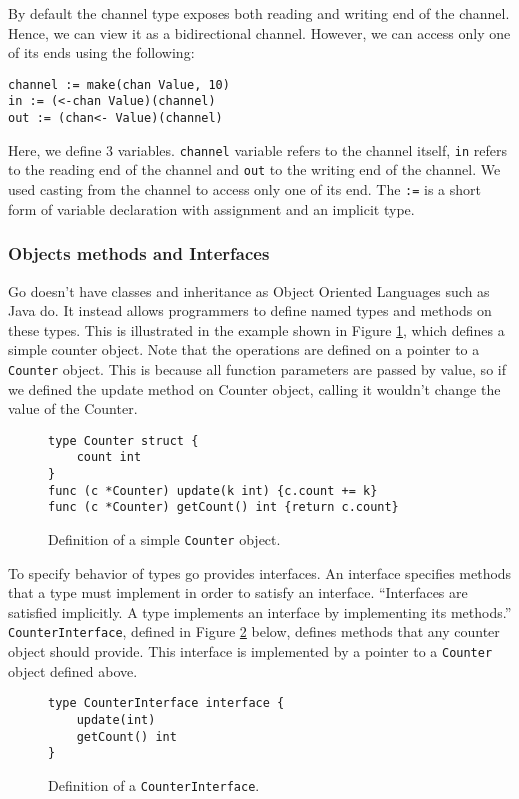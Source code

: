 \documentclass[12pt,a4paper]{article}
\begin{document}
By default the channel type exposes both reading and writing end of the
channel. Hence, we can view it as a bidirectional channel. 
However, we can access only one of its ends using the following:
\begin{lstlisting}
channel := make(chan Value, 10)
in := (<-chan Value)(channel)
out := (chan<- Value)(channel)
\end{lstlisting}
Here, we define 3 variables. \texttt{channel} variable refers to the 
channel itself, \texttt{in} refers to the reading end of the channel
and \texttt{out} to the writing end of the channel. We used casting
from the channel to access only one of its end. The \texttt{:=} is a
short form of variable declaration with assignment and an implicit type.

\subsubsection{Objects methods and Interfaces}
Go doesn't have classes and inheritance as Object Oriented Languages 
such as Java do. It instead allows programmers to define named types
and methods on these types. This is illustrated in the example shown in 
Figure \ref{fig:counterObj}, which defines a simple counter object.
Note that the operations are defined on a pointer to a \texttt{Counter}
object. This is because all function parameters are passed by value, so
if we defined the update method on Counter object, calling it wouldn't
change the value of the Counter.

\begin{figure}[h]
\centering
\begin{lstlisting}
type Counter struct {
    count int
}
func (c *Counter) update(k int) {c.count += k}
func (c *Counter) getCount() int {return c.count}
\end{lstlisting}
\caption[scale=1.0]{Definition of a simple \texttt{Counter} object.}
\label{fig:counterObj}
\end{figure}

To specify behavior of types go provides interfaces. An interface
specifies methods that a type must implement in order to satisfy an 
interface. ``Interfaces are satisfied implicitly. A type implements 
an interface by implementing its methods.'' \cite{tour}
\texttt{CounterInterface}, defined in Figure \ref{fig:counterInter} below,
defines methods that any counter object should provide. This interface 
is implemented by a pointer to a \texttt{Counter} object defined above.

\begin{figure}[h]
\centering
\begin{lstlisting}
type CounterInterface interface {
    update(int)
    getCount() int
}
\end{lstlisting}
\caption[scale=1.0]{Definition of a \texttt{CounterInterface}.}
\label{fig:counterInter}
\end{figure}
\end{document}
